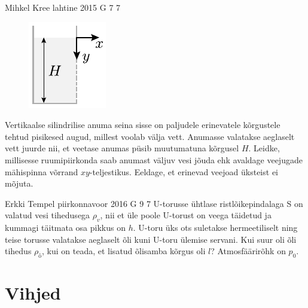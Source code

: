 \documentclass[11pt, twoside]{article}
\begin{document}
{%
{Mihkel Kree} %
{lahtine} %
{2015} %
{G 7} %
{7} %
{
\ifStatement
\begin{figure}%
\vspace{-15pt}
\includegraphics[width=\linewidth]{2015-lahg-07-veejoadJoon}%
\end{figure}
Vertikaalse silindrilise anuma seina sisse on paljudele erinevatele kõrgustele tehtud pisikesed augud, millest voolab välja vett. Anumasse valatakse aeglaselt vett juurde nii, et veetase anumas püsib muutumatuna kõrgusel $H$. Leidke, millisesse ruumipiirkonda saab anumast väljuv vesi jõuda ehk avaldage veejugade mähispinna võrrand $xy$-teljestikus. Eeldage, et erinevad veejoad üksteist ei mõjuta.
\fi
}

{Erkki Tempel} %
{piirkonnavoor} %
{2016} %
{G 9} %
{7} %
{
\ifStatement
U-torusse ühtlase ristlõikepindalaga S on valatud vesi tihedusega $\rho_v$, nii et üle poole U-torust on veega täidetud ja kummagi täitmata osa pikkus on $h$. U-toru üks ots suletakse hermeetiliselt ning teise torusse valatakse aeglaselt õli kuni U-toru ülemise servani. Kui suur oli õli tihedus $\rho_{\text{õ}}$, kui on teada, et lisatud õlisamba kõrgus oli $l$? Atmosfäärirõhk on $p_0$.
\fi
}
\newpage\normalsize\section{Vihjed}
        \ToggleHint
        
}
\end{document}
